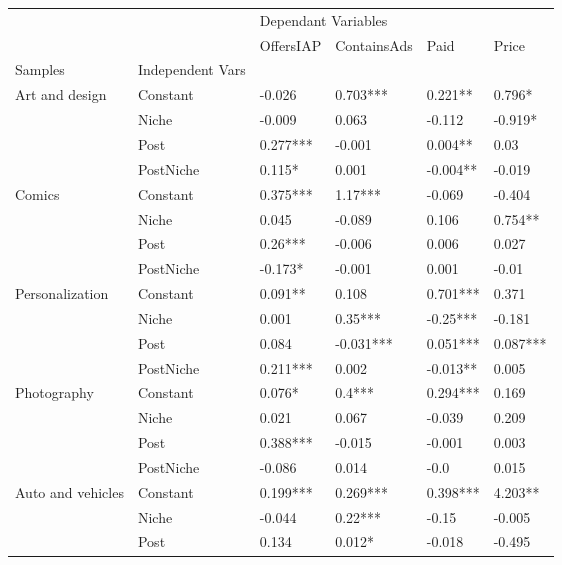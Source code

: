 \begin{table}[h!]
\centering
\begin{tabular}{llllll}
\toprule
          &           & \multicolumn{4}{l}{Dependant Variables} \\
          &           &           OffersIAP & ContainsAds &       Paid &      Price \\
Samples & Independent Vars &                     &             &            &            \\
\midrule
\multirow{4}{*}{Art and design} & Constant &  -0.026 &  0.703*** &  0.221** &  0.796* \\
          & Niche &  -0.009 &  0.063 &  -0.112 &  -0.919* \\
          & Post &  0.277*** &  -0.001 &  0.004** &  0.03 \\
          & PostNiche &  0.115* &  0.001 &  -0.004** &  -0.019 \\
\cline{1-6}
\multirow{4}{*}{Comics} & Constant &  0.375*** &  1.17*** &  -0.069 &  -0.404 \\
          & Niche &  0.045 &  -0.089 &  0.106 &  0.754** \\
          & Post &  0.26*** &  -0.006 &  0.006 &  0.027 \\
          & PostNiche &  -0.173* &  -0.001 &  0.001 &  -0.01 \\
\cline{1-6}
\multirow{4}{*}{Personalization} & Constant &  0.091** &  0.108 &  0.701*** &  0.371 \\
          & Niche &  0.001 &  0.35*** &  -0.25*** &  -0.181 \\
          & Post &  0.084 &  -0.031*** &  0.051*** &  0.087*** \\
          & PostNiche &  0.211*** &  0.002 &  -0.013** &  0.005 \\
\cline{1-6}
\multirow{4}{*}{Photography} & Constant &  0.076* &  0.4*** &  0.294*** &  0.169 \\
          & Niche &  0.021 &  0.067 &  -0.039 &  0.209 \\
          & Post &  0.388*** &  -0.015 &  -0.001 &  0.003 \\
          & PostNiche &  -0.086 &  0.014 &  -0.0 &  0.015 \\
\cline{1-6}
\multirow{4}{*}{Auto and vehicles} & Constant &  0.199*** &  0.269*** &  0.398*** &  4.203** \\
          & Niche &  -0.044 &  0.22*** &  -0.15 &  -0.005 \\
          & Post &  0.134 &  0.012* &  -0.018 &  -0.495 \\

\end{tabular}
\end{table}
